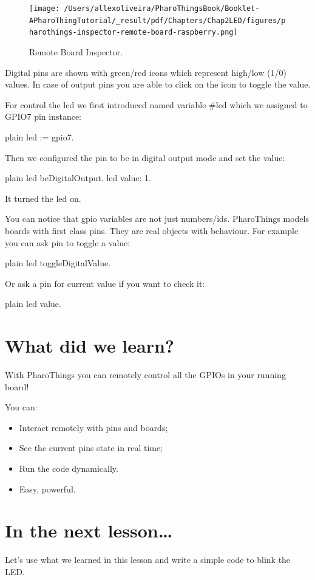 \documentclass[10pt,twoside,english]{_support/latex/sbabook/sbabook}
\begin{document}
\begin{figure}

\begin{center}
\texttt{[image: /Users/allexoliveira/PharoThingsBook/Booklet-APharoThingTutorial/\_result/pdf/Chapters/Chap2LED/figures/pharothings-inspector-remote-board-raspberry.png]}\caption{Remote Board Inspector.\label{remoteBoard}}\end{center}
\end{figure}


Digital pins are shown with green/red icons which represent high/low (1/0) values. In case of output pins you are able to click on the icon to toggle the value.

For control the led we first introduced named variable \#led which we assigned to GPIO7 pin instance:

\begin{displaycode}{plain}
led := gpio7.
\end{displaycode}

Then we configured the pin to be in digital output mode and set the value:

\begin{displaycode}{plain}
led beDigitalOutput.
led value: 1.
\end{displaycode}

It turned the led on.

You can notice that gpio variables are not just numbers/ids. PharoThings models boards with first class pins. They are real objects with behaviour. For example you can ask pin to toggle a value:

\begin{displaycode}{plain}
led toggleDigitalValue.
\end{displaycode}

Or ask a pin for current value if you want to check it:

\begin{displaycode}{plain}
led value.
\end{displaycode}
\section{What did we learn?}
With PharoThings you can remotely control all the GPIOs in your running board!

You can:

\begin{itemize}
\item Interact remotely with pins and boards;
\item See the current pins state in real time;
\item Run the code dynamically.
\item Easy, powerful.
\end{itemize}
\section{In the next lesson…}
Let’s use what we learned in this lesson and write a simple code to blink the LED.


\backmatter

\end{document}
